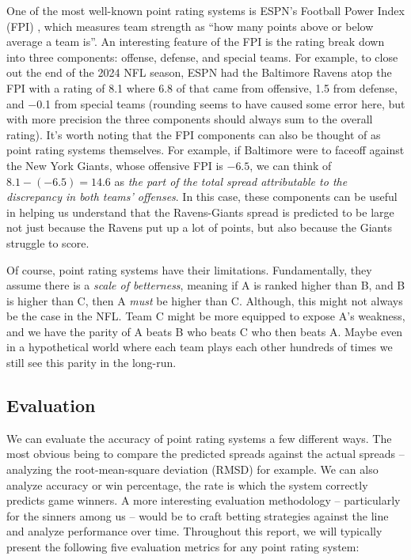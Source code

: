 \documentclass{report}
\begin{document}
One of the most well-known point rating systems is ESPN's Football Power Index (FPI) \cite{espn-fpi}, which measures team strength as ``how many points above or below average a team is''.
An interesting feature of the FPI is the rating break down into three components: offense, defense, and special teams.
For example, to close out the end of the 2024 NFL season, ESPN had the Baltimore Ravens atop the FPI with a rating of 8.1 where 6.8 of that came from offensive, 1.5 from defense, and $-$0.1 from special teams (rounding seems to have caused some error here, but with more precision the three components should always sum to the overall rating).
It's worth noting that the FPI components can also be thought of as point rating systems themselves.
For example, if Baltimore were to faceoff against the New York Giants, whose offensive FPI is $-6.5$, we can think of $8.1 - (-6.5) = 14.6$ as \textit{the part of the total spread attributable to the discrepancy in both teams' offenses}.
In this case, these components can be useful in helping us understand that the Ravens-Giants spread is predicted to be large not just because the Ravens put up a lot of points, but also because the Giants struggle to score.

Of course, point rating systems have their limitations.
Fundamentally, they assume there is a \textit{scale of betterness}, meaning if A is ranked higher than B, and B is higher than C, then A \textit{must} be higher than C.
Although, this might not always be the case in the NFL.
Team C might be more equipped to expose A's weakness, and we have the parity of A beats B who beats C who then beats A.
Maybe even in a hypothetical world where each team plays each other hundreds of times we still see this parity in the long-run.

\subsection*{Evaluation}

We can evaluate the accuracy of point rating systems a few different ways.
The most obvious being to compare the predicted spreads against the actual spreads -- analyzing the root-mean-square deviation (RMSD) for example.
We can also analyze accuracy or win percentage, the rate is which the system correctly predicts game winners.
A more interesting evaluation methodology -- particularly for the sinners among us -- would be to craft betting strategies against the line and analyze performance over time.
Throughout this report, we will typically present the following five evaluation metrics for any point rating system:
\end{document}
